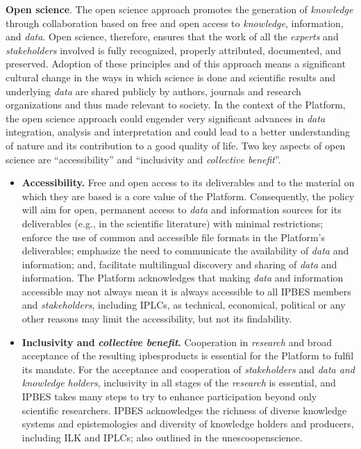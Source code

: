 \documentclass{article}
\begin{document}
\textbf{Open science}. The open science approach promotes the generation of \textit{knowledge }through collaboration based on free and open access to \textit{knowledge}, information, and \textit{data}. Open science, therefore, ensures that the work of all the \textit{experts} and \textit{stakeholders} involved is fully recognized, properly attributed, documented, and preserved. Adoption of these principles and of this approach means a significant cultural change in the ways in which science is done and scientific results and underlying \textit{data} are shared publicly by authors, journals and research organizations and thus made relevant to society. In the context of the Platform, the open science approach could engender very significant advances in \textit{data} integration, analysis and interpretation and could lead to a better understanding of nature and its contribution to a good quality of life. Two key aspects of open science are “accessibility” and “inclusivity and \textit{collective benefit}”.
\begin{itemize}
    \item \textbf{Accessibility.} Free and open access to its deliverables and to the material on which they are based is a core value of the Platform. Consequently, the policy will aim for open, permanent access to \textit{data} and information sources for its deliverables (e.g., in the scientific literature) with minimal restrictions; enforce the use of common and accessible file formats in the Platform’s deliverables; emphasize the need to communicate the availability of \textit{data} and information; and, facilitate multilingual discovery and sharing of \textit{data} and information. The Platform acknowledges that making \textit{data} and information accessible may not always mean it is always accessible to all IPBES members and\textit{ stakeholders}, including IPLCs, as technical, economical, political or any other reasons may limit the accessibility, but not its findability.
    \item \textbf{Inclusivity and }\textit{\textbf{collective benefit}}\textbf{.} Cooperation in \textit{research} and broad acceptance of the resulting \gls{ipbesproducts} is essential for the Platform to fulfil its mandate. For the acceptance and cooperation of \textit{stakeholders} and \textit{data and knowledge holders}, inclusivity in all stages of the \textit{research} is essential, and IPBES takes many steps to try to enhance participation beyond only scientific researchers. IPBES acknowledges the richness of diverse knowledge systems and epistemologies and diversity of knowledge holders and producers, including ILK and IPLCs; also outlined in the \gls{unescoopenscience}.
\end{itemize}
\end{document}
